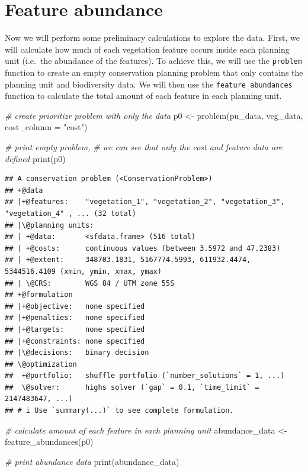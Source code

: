 \documentclass[
  12pt,
]{book}
\newenvironment{Shaded}{\begin{snugshade}}{\end{snugshade}}
\newcommand{\AttributeTok}[1]{\textcolor[rgb]{0.77,0.63,0.00}{#1}}
\newcommand{\CommentTok}[1]{\textcolor[rgb]{0.56,0.35,0.01}{\textit{#1}}}
\newcommand{\FunctionTok}[1]{\textcolor[rgb]{0.00,0.00,0.00}{#1}}
\newcommand{\NormalTok}[1]{#1}
\newcommand{\OtherTok}[1]{\textcolor[rgb]{0.56,0.35,0.01}{#1}}
\newcommand{\StringTok}[1]{\textcolor[rgb]{0.31,0.60,0.02}{#1}}
\begin{document}
\hypertarget{feature-abundance}{%
\section{Feature abundance}\label{feature-abundance}}

Now we will perform some preliminary calculations to explore the data. First, we will calculate how much of each vegetation feature occurs inside each planning unit (i.e.~the abundance of the features). To achieve this, we will use the \texttt{problem} function to create an empty conservation planning problem that only contains the planning unit and biodiversity data. We will then use the \texttt{feature\_abundances} function to calculate the total amount of each feature in each planning unit.

\begin{Shaded}
\begin{Highlighting}[]
\CommentTok{\# create prioritizr problem with only the data}
\NormalTok{p0 }\OtherTok{\textless{}{-}} \FunctionTok{problem}\NormalTok{(pu\_data, veg\_data, }\AttributeTok{cost\_column =} \StringTok{"cost"}\NormalTok{)}

\CommentTok{\# print empty problem,}
\CommentTok{\# we can see that only the cost and feature data are defined}
\FunctionTok{print}\NormalTok{(p0)}
\end{Highlighting}
\end{Shaded}

\begin{verbatim}
## A conservation problem (<ConservationProblem>)
## +@data
## |+@features:    "vegetation_1", "vegetation_2", "vegetation_3", "vegetation_4" , ... (32 total)
## |\@planning units:
## | +@data:       <sfdata.frame> (516 total)
## | +@costs:      continuous values (between 3.5972 and 47.2383)
## | +@extent:     348703.1831, 5167774.5993, 611932.4474, 5344516.4109 (xmin, ymin, xmax, ymax)
## | \@CRS:        WGS 84 / UTM zone 55S
## +@formulation
## |+@objective:   none specified
## |+@penalties:   none specified
## |+@targets:     none specified
## |+@constraints: none specified
## |\@decisions:   binary decision
## \@optimization
##  +@portfolio:   shuffle portfolio (`number_solutions` = 1, ...)
##  \@solver:      highs solver (`gap` = 0.1, `time_limit` = 2147483647, ...)
## # i Use `summary(...)` to see complete formulation.
\end{verbatim}

\begin{Shaded}
\begin{Highlighting}[]
\CommentTok{\# calculate amount of each feature in each planning unit}
\NormalTok{abundance\_data }\OtherTok{\textless{}{-}} \FunctionTok{feature\_abundances}\NormalTok{(p0)}

\CommentTok{\# print abundance data}
\FunctionTok{print}\NormalTok{(abundance\_data)}
\end{Highlighting}
\end{Shaded}
\end{document}
